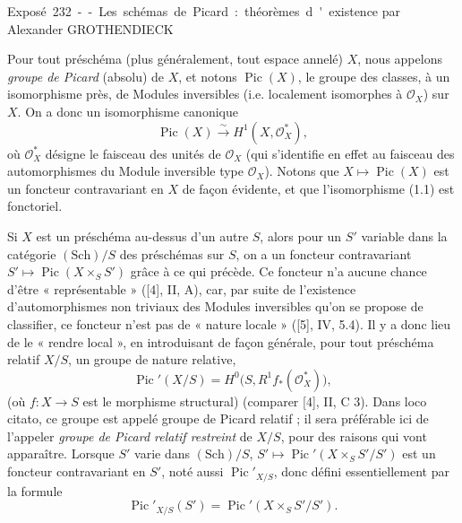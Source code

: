\unit{Exposé 232 -- Les schémas de Picard : théorèmes d'existence}
%
  {par Alexander GROTHENDIECK}


Pour tout préschéma (plus généralement, tout espace annelé) $X$, nous appelons
\emph{groupe de Picard} (absolu) de $X$, et notons $\operatorname{Pic}(X)$, le
groupe des classes, à un isomorphisme près, de Modules inversibles (i.e.
localement isomorphes à $\mathcal O_X$) sur $X$. On a donc un isomorphisme
canonique
\begin{equation}
\operatorname{Pic}(X)\xrightarrow{\sim}H^1(X,\mathcal O_X^*),
\tag{1.1}
\end{equation}
où $\mathcal O_X^*$ désigne le faisceau des unités de $\mathcal O_X$ (qui
s'identifie en effet au faisceau des automorphismes du Module inversible type
$\mathcal O_X$). Notons que $X\longmapsto\operatorname{Pic}(X)$ est un foncteur
contravariant en $X$ de façon évidente, et que l'isomorphisme (1.1) est
fonctoriel.

Si $X$ est un préschéma au-dessus d'un autre $S$, alors pour un $S'$ variable
dans la catégorie $(\mathrm{Sch})/S$ des préschémas sur $S$, on a un foncteur
contravariant $S'\longmapsto\operatorname{Pic}(X\times_S S')$ grâce à ce qui
précède. Ce foncteur n'a aucune chance d'être « représentable » ([4], II, A),
car, par suite de l'existence d'automorphismes non triviaux des Modules
inversibles qu'on se propose de classifier, ce foncteur n'est pas de « nature
locale » ([5], IV, 5.4). Il y a donc lieu de le « rendre local », en introduisant
de façon générale, pour tout préschéma relatif $X/S$, un groupe de nature
relative,
\begin{equation}
\operatorname{Pic}'(X/S)=H^0\bigl(S,R^1f_*(\mathcal O_X^*)\bigr),
\tag{1.2}
\end{equation}
(où $f:X\longrightarrow S$ est le morphisme structural) (comparer [4], II,
C 3). Dans loco citato, ce groupe est appelé groupe de Picard relatif ; il sera
préférable ici de l'appeler \emph{groupe de Picard relatif restreint} de $X/S$,
pour des raisons qui vont apparaître. Lorsque $S'$ varie dans $(\mathrm{Sch})/S$,
$S'\longmapsto\operatorname{Pic}'(X\times_S S'/S')$ est un foncteur
contravariant en $S'$, noté aussi $\operatorname{Pic}'_{X/S}$, donc défini
essentiellement par la formule
\begin{equation}
\operatorname{Pic}'_{X/S}(S')=
\operatorname{Pic}'(X\times_S S'/S').
\tag{1.3}
\end{equation}

